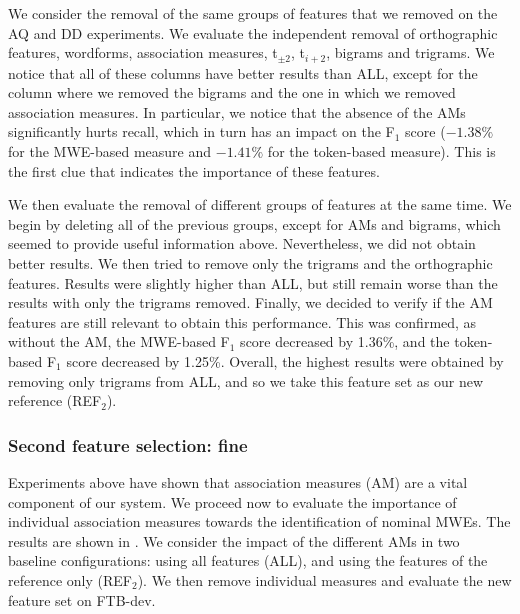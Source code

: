 \documentclass[output=paper,
modfonts
]{langscibook}
\begin{document}
We consider the removal of the same groups of features that we removed on the AQ and DD experiments. We evaluate the independent removal of orthographic features, wordforms, association measures, t$_{\pm 2}$, t$_{i+2}$, bigrams and trigrams. We notice that all of these columns have better results than ALL, except for the column where we removed the bigrams and the one in which we removed association measures. In particular, we notice that the absence of the AMs significantly hurts recall, which in turn has an impact on the F$_1$ score ($-1.38\%$ for the MWE-based measure and $-1.41\%$ for the token-based measure). This is the first clue that indicates the importance of these features. 

We then evaluate the removal of different groups of features at the same time. We begin by deleting all of the previous groups, except for AMs and bigrams, which seemed to provide useful information above. Nevertheless, we did not obtain better results.
We then tried to remove only the trigrams and the orthographic features. Results were slightly higher than ALL, but still remain worse than the results with only the trigrams removed. Finally, we decided to verify if the AM features are still relevant to obtain this performance. This was confirmed, as without the AM, the MWE-based F$_1$ score decreased by 1.36\%, and the token-based F$_1$ score decreased by 1.25\%. 
Overall, the highest results were obtained by removing only trigrams from ALL, and so we take this feature set as our new reference (REF$_2$).  %



\subsubsection{Second feature selection: fine}
\label{schol:sec:results-nominal-feat-fine}
Experiments above have shown that association measures (AM) are a vital component of our system.
We proceed now to evaluate the importance of individual association measures towards the identification of nominal MWEs. The results are shown in .
%
We consider the impact of the different AMs in two baseline configurations: using all features (ALL), and using the features of the reference only (REF$_2$). We then remove individual measures and evaluate the new feature set on FTB-dev.


\end{document}

